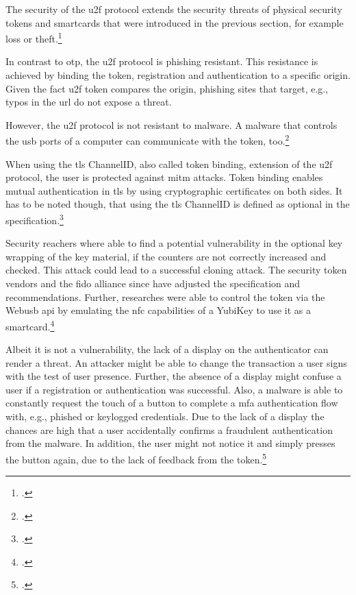 The security of the \gls{u2f} protocol extends the security threats of physical security tokens and smartcards that were introduced in the previous section, for example loss or theft.\footcites[See][12--13]{fido-sec-ref}

In contrast to \gls{otp}, the \gls{u2f} protocol is phishing resistant. This resistance is achieved by binding the token, registration and authentication to a specific origin. Given the fact \gls{u2f} token compares the origin, phishing sites that target, e.g., typos in the \gls{url} do not expose a threat.

However, the \gls{u2f} protocol is not resistant to malware. A malware that controls the \gls{usb} ports of a computer can communicate with the token, too.\footcites[See][10--1]{8429292}[See][9]{u2f-overview}

When using the \gls{tls} ChannelID, also called token binding, extension of the \gls{u2f} protocol, the user is protected against \gls{mitm} attacks. Token binding enables mutual authentication in \gls{tls} by using cryptographic certificates on both sides. It has to be noted though, that using the \gls{tls} ChannelID is defined as optional in the specification.\footcites[See][6--7]{u2f-overview}

Security reachers where able to find a potential vulnerability in the optional key wrapping of the key material, if the counters are not correctly increased and checked. This attack could lead to a successful cloning attack. The security token vendors and the \gls{fido} alliance since have adjusted the specification and recommendations. Further, researches were able to control the token via the Web\gls{usb} \gls{api} by emulating the \gls{nfc} capabilities of a YubiKey to use it as a smartcard.\footcites[See][3]{DBLP:journals/corr/abs-1906-06009}

Albeit it is not a vulnerability, the lack of a display on the authenticator can render a threat. An attacker might be able to change the transaction a user signs with the test of user presence. Further, the absence of a display might confuse a user if a registration or authentication was successful. Also, a malware is able to constantly request the touch of a button to complete a \gls{mfa} authentication flow with, e.g., phished or keylogged credentials. Due to the lack of a display the chances are high that a user accidentally confirms a fraudulent authentication from the malware. In addition, the user might not notice it and simply presses the button again, due to the lack of feedback from the token.\footcites[See][434]{10.1007/978-3-662-54970-4_25}[See][15]{das2018johnny}[See][1518--1519]{238325}[See][884]{8418643}


